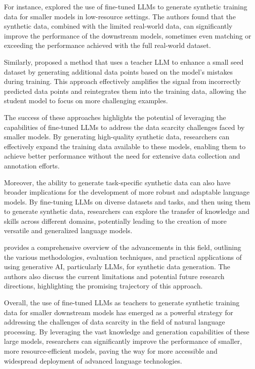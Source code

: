 \documentclass[11pt]{article}
\begin{document}
For instance, \cite{ref216} explored the use of fine-tuned LLMs to generate synthetic training data for smaller models in low-resource settings. The authors found that the synthetic data, combined with the limited real-world data, can significantly improve the performance of the downstream models, sometimes even matching or exceeding the performance achieved with the full real-world dataset.

Similarly, \cite{ref225} proposed a method that uses a teacher LLM to enhance a small seed dataset by generating additional data points based on the model's mistakes during training. This approach effectively amplifies the signal from incorrectly predicted data points and reintegrates them into the training data, allowing the student model to focus on more challenging examples.

The success of these approaches highlights the potential of leveraging the capabilities of fine-tuned LLMs to address the data scarcity challenges faced by smaller models. By generating high-quality synthetic data, researchers can effectively expand the training data available to these models, enabling them to achieve better performance without the need for extensive data collection and annotation efforts.

Moreover, the ability to generate task-specific synthetic data can also have broader implications for the development of more robust and adaptable language models. By fine-tuning LLMs on diverse datasets and tasks, and then using them to generate synthetic data, researchers can explore the transfer of knowledge and skills across different domains, potentially leading to the creation of more versatile and generalized language models.

\cite{ref226} provides a comprehensive overview of the advancements in this field, outlining the various methodologies, evaluation techniques, and practical applications of using generative AI, particularly LLMs, for synthetic data generation. The authors also discuss the current limitations and potential future research directions, highlighting the promising trajectory of this approach.

Overall, the use of fine-tuned LLMs as teachers to generate synthetic training data for smaller downstream models has emerged as a powerful strategy for addressing the challenges of data scarcity in the field of natural language processing. By leveraging the vast knowledge and generation capabilities of these large models, researchers can significantly improve the performance of smaller, more resource-efficient models, paving the way for more accessible and widespread deployment of advanced language technologies.
\end{document}
